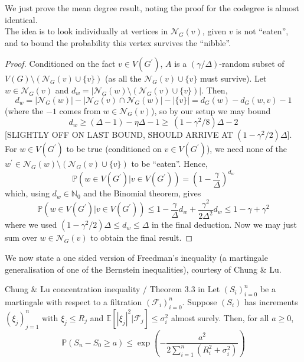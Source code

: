 \documentclass{article}
\begin{document}
We just prove the mean degree result, noting the proof for the codegree is almost identical. \\

The idea is to look individually at vertices in $\mathcal{N}_G(v)$, given $v$ is not ``eaten'', and to bound the 
probability this vertex survives the ``nibble''.

\begin{proof}
     Conditioned on the fact $v \in V(G^\prime)$, $A$ is a $(\gamma/\Delta)$-random subset of 
     $V(G) \setminus (\mathcal{N}_G(v) \cup \{v\})$ (as all the $\mathcal{N}_G(v) \cup \{v\}$ must survive). 
     Let $w \in \mathcal{N}_G(v)$ and $d_w = |\mathcal{N}_G(w) \setminus (\mathcal{N}_G(v) \cup \{v\})|$. 
     Then, \[d_w = |\mathcal{N}_G(w)| - |\mathcal{N}_G(v) \cap \mathcal{N}_G(w)| - |\{v\}| 
     = d_G(w) - d_G(w, v) - 1\]
     (where the $-1$ comes from $w \in \mathcal{N}_G(v)$), so by our setup we may bound 
     \[d_w \geq (\Delta - 1) - \eta\Delta - 1 \geq \ (1 - \gamma^2/8)\Delta - 2\]
     [SLIGHTLY OFF ON LAST BOUND, SHOULD ARRIVE AT $(1 - \gamma^2/2)\Delta$]. \\
     For $w \in V(G^\prime)$ to be true (conditioned on $v \in V(G^\prime)$), we need none of the $w^\prime \in 
     \mathcal{N}_G(w) \setminus (\mathcal{N}_G(v) \cup \{v\})$ to be ``eaten''. Hence, 
     \[\mathbb{P}(w \in V(G^\prime) | v \in V(G^\prime)) = \left(1 - \frac{\gamma}{\Delta}\right)^{d_w}\]
     which, using $d_w \in \mathbb{N}_0$ and the Binomial theorem, gives 
     \[\mathbb{P}(w \in V(G^\prime) | v \in V(G^\prime)) \leq 1 - \frac{\gamma}{\Delta}d_w + \frac{\gamma^2}{2\Delta^2}d_w
     \leq 1 - \gamma + \gamma^2\] where we used $(1-\gamma^2/2)\Delta \leq d_w \leq \Delta$ in the final deduction. 
     Now we may just sum over $w \in \mathcal{N}_G(v)$ to obtain the final result.
\end{proof}

We now state a one sided version of Freedman's inequality (a martingale generalisation of one of the Bernstein 
inequalities), courtesy of Chung $\&$ Lu. 

\begin{proposition}[]{Chung $\&$ Lu concentration inequality / Theorem 3.3 in \cite{campos2023}}
    Let $(S_i)_{i=0}^n$ be a martingale with respect to a filtration $(\mathcal{F}_i)_{i=0}^n$. Suppose $(S_i)$ 
    has increments $(\xi_j)_{j=1}^n$ with $\xi_j \leq R_j$ and $\mathbb{E}[|\xi_j|^2 | \mathcal{F}_j] \leq \sigma_i^2$ 
    almost surely. Then, for all $a \geq 0$, \[\mathbb{P}(S_n - S_0 \geq a) 
    \leq \exp\left(-\frac{a^2}{2\sum_{i=1}^n(R_i^2 + \sigma_i^2)}\right)\]
\end{proposition}
\end{document}
